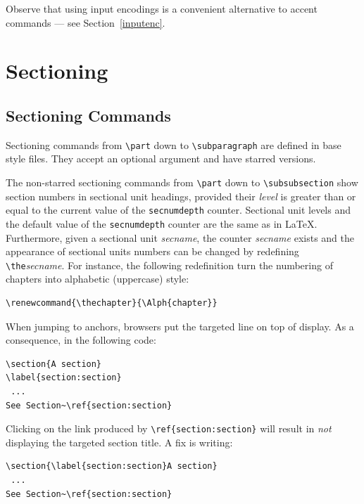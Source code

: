 Observe that using input encodings
is a convenient alternative to accent commands ---
see Section~\ref{inputenc}.

\section{Sectioning}

\subsection{\label{section:section}Sectioning Commands}
Sectioning commands from \verb+\part+ down to
\verb+\subparagraph+ are defined in base style files.
They accept an optional argument and have starred versions.


The non-starred sectioning commands from \verb+\part+ down to
\verb+\subsubsection+ show section numbers in sectional unit headings,
provided their \textit{level} is greater than or equal to the current
value of the \verb+secnumdepth+ counter.
Sectional unit levels and the default value of the \verb+secnumdepth+ counter
are the same as in \LaTeX{}.
Furthermore, given a sectional unit {\it secname}, the
counter {\it secname} exists and the appearance of sectional units
numbers can be changed by redefining \verb+\the+{\it secname}.
For instance, the following redefinition turn the numbering of
chapters into alphabetic (uppercase) style:
\begin{verbatim}
\renewcommand{\thechapter}{\Alph{chapter}}
\end{verbatim}

%
When jumping to anchors, browsers put the targeted line on top
of display. As a consequence, in the following code:
\begin{verbatim}
\section{A section}
\label{section:section}
 ...
See Section~\ref{section:section}
\end{verbatim}
Clicking on the link produced by
\verb"\ref{section:section}" will result in \emph{not} displaying the
targeted section title.
A fix is writing:
\begin{verbatim}
\section{\label{section:section}A section}
 ...
See Section~\ref{section:section}
\end{verbatim}

